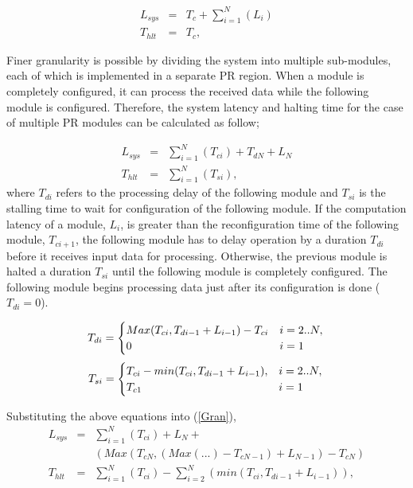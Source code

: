 \begin{eqnarray}
\label{Mono}
L_{sys} &=& T_{c} + \sum_{i = 1}^{N}    (L_{i}) \nonumber \\
T_{hlt} &=& T_{c},
\end{eqnarray}

Finer granularity is possible by dividing the system into multiple sub-modules, each of which is implemented in a separate PR region. When a module is completely configured, it can process the received data while the following module is configured. Therefore, the system latency and halting time for the case of multiple PR modules can be calculated as follow;

\begin{eqnarray}
\label{Gran}
L_{sys} &=&  \sum_{i = 1}^{N} (T_{ci}) + T_{dN} + L_{N} \nonumber \\
T_{hlt} &=&  \sum_{i = 1}^{N}  (T_{si}),
\end{eqnarray}
where $T_{di}$ refers to the processing delay of the following module and $T_{si}$ is the stalling time to wait for configuration of the following module. If the computation latency of a module, $L_{i}$, is greater than the reconfiguration time of the following module,  $T_{ci+1}$, the following module has to delay operation by a duration $T_{di}$ before it receives input data for processing. Otherwise, the previous module is halted a duration $T_{si}$ until the following module is completely configured. The following module begins processing data just after its configuration is done ($T_{di} = 0$).

\begin{equation}
\label{DelayTime}
T_{di} = \begin{cases} Max(T_{ci}, T_{di-1}+L_{i-1}) - T_{ci}  	& i = 2..N, \\
						0 										& i = 1 \end{cases}  \\
\end{equation}
\begin{equation}
\label{HaltTime}
T_{si} = \begin{cases} T_{ci} - min(T_{ci}, T_{di-1}+L_{i-1}), 	&  i = 2..N, \\
					  T_{c1}									&  i=1 \end{cases}  \\
\end{equation}

Substituting the above equations into (\ref{Gran}),
\begin{eqnarray}
\label{Gran2}
L_{sys} &= & \sum_{i = 1}^{N}(T_{ci}) + L_{N} +   \nonumber \\
		& & (Max(T_{cN}, (Max( ... ) - T_{cN-1}) + L_{N-1}) - T_{cN})  \nonumber \\
T_{hlt} &= &\sum_{i = 1}^{N}(T_{ci})  -  \sum_{i = 2}^{N}  (min(T_{ci}, T_{di-1}+L_{i-1})),
\end{eqnarray}

